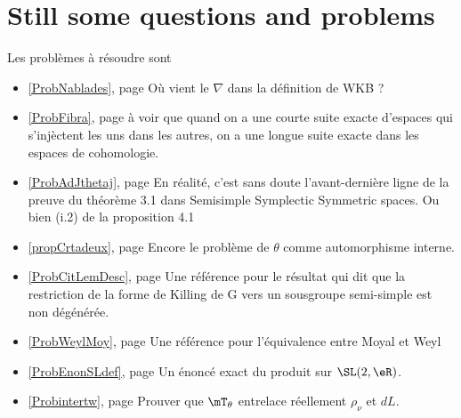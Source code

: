 \newcommand{\refprob}[1]{\ref{#1}, page \pageref{#1}}

\section{Still some questions and problems}

Les problèmes à résoudre sont
\begin{itemize}

\item \refprob{ProbNablades} Où vient le $\nabla$ dans la définition de WKB ?
 \item \refprob{ProbFibra} à voir que quand on a une courte suite exacte d'espaces qui s'injèctent les uns dans les autres, on a une longue suite exacte dans les espaces de cohomologie.
\item  \refprob{ProbAdJthetaj} En réalité, c'est sans doute l'avant-dernière ligne de la preuve du théorème 3.1 dans Semisimple Symplectic Symmetric spaces. Ou bien (i.2) de la proposition 4.1
\item \refprob{propCrtadeux} Encore le problème de $\theta$ comme automorphisme interne.

\item \refprob{ProbCitLemDesc} Une référence pour le résultat qui dit que la restriction de la forme de Killing de G vers un sousgroupe semi-simple est non dégénérée.
\item \refprob{ProbWeylMoy} Une référence pour l'équivalence entre Moyal et Weyl
\item \refprob{ProbEnonSLdef} Un énoncé exact du produit sur $\SL(2,\eR)$.
\item \refprob{Probintertw} Prouver que $\mT_{\theta}$ entrelace réellement $\rho_{\nu}$ et $dL$.
\end{itemize}



